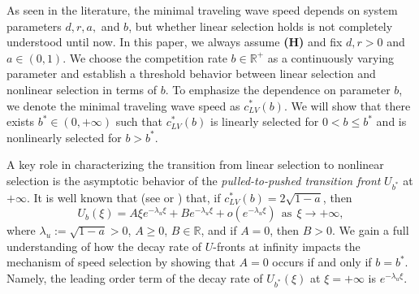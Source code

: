 \documentclass[11pt,a4paper]{article}
\numberwithin{equation}{section}
\numberwithin{figure}{section}
\newcommand{\red}[1]{{\color{red}#1}}
\newcommand{\blue}[1]{{\color{blue}#1}}
\begin{document}
As seen in the literature, the minimal traveling wave speed depends on system parameters $d, r, a,$ and $b$, but whether linear selection holds is not completely understood until now.
In this paper, we always assume {\bf(H)} and fix $d,r>0$ and $a\in(0,1)$.
We choose the competition rate $b\in\mathbb{R}^+$
as a continuously varying parameter and establish a threshold behavior between linear selection and nonlinear selection in terms of $b$.
To emphasize the dependence on parameter $b$, we denote the minimal traveling wave speed as $c^*_{LV}(b)$.
We will show that there exists $b^*\in(0,+\infty)$ such that
$c_{LV}^{*}(b)$ is linearly selected for $0<b\leq b^*$ and is nonlinearly selected for $b>b^*$. %




A key role in characterizing the transition from linear selection to nonlinear selection is
the asymptotic behavior of the {\em pulled-to-pushed transition front} $U_{b^{*}}$ at $+\infty$. %
It is well known that (see  \cite{Girardin Lam} or \cite{MoritaTachibana2009}) that, if $c^*_{LV}(b)=2\sqrt{1-a}$, then
\begin{equation}\label{1}
U_{b}(\xi)=A\xi e^{-\lambda_u\xi}+B e^{-\lambda_u\xi}+o(e^{-\lambda_u\xi})\ \ \mbox{as}\ \ \xi\to+\infty,
\end{equation}
where $\lambda_u:=\sqrt{1-a}>0$, $A\geq0$, $B\in\mathbb{R}$, and
if $A=0$, then $B>0$. We gain a full understanding of how the decay rate of $U$-fronts at infinity impacts the mechanism of speed selection by showing that $A=0$ occurs if and only if  $b=b^*$.
Namely, the leading order term of the decay rate of $U_{b^{*}}(\xi)$ at $\xi=+\infty$ is $e^{-\lambda_u\xi}$.
\end{document}
